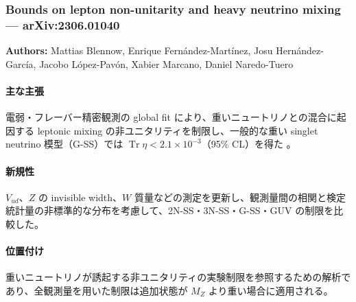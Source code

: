 \subsubsection{Bounds on lepton non-unitarity and heavy neutrino mixing --- arXiv:2306.01040}

\textbf{Authors:} Mattias Blennow, Enrique Fernández-Martínez, Josu Hernández-García, Jacobo López-Pavón, Xabier Marcano, Daniel Naredo-Tuero

\paragraph{主な主張}
電弱・フレーバー精密観測の global fit により、重いニュートリノとの混合に起因する leptonic mixing の非ユニタリティを制限し、一般的な重い singlet neutrino 模型（G-SS）では $\operatorname{Tr}\eta<2.1\times10^{-3}$（95\% CL）を得た \cite{Blennow:2023NonUnitarity}。

\paragraph{新規性}
$V_{ud}$、$Z$ の invisible width、$W$ 質量などの測定を更新し、観測量間の相関と検定統計量の非標準的な分布を考慮して、2N-SS・3N-SS・G-SS・GUV の制限を比較した。

\paragraph{位置付け}
重いニュートリノが誘起する非ユニタリティの実験制限を参照するための解析であり、全観測量を用いた制限は追加状態が $M_Z$ より重い場合に適用される。
